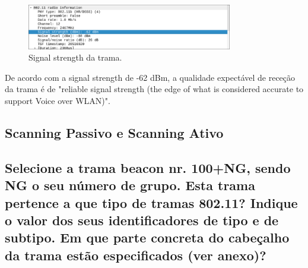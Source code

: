 \begin{figure}[h]
    \centering
    \includegraphics[width=0.8\textwidth]{signal.png}
    \caption{\label{fig:signal}Signal strength da trama.}
\end{figure}

De acordo com a signal strength de -62 dBm, a qualidade expectável de receção da trama é de "reliable signal strength (the edge of what is considered accurate to support Voice over WLAN)".

\subsection*{Scanning Passivo e Scanning Ativo}
\subsection{Selecione a trama beacon nr. 100+NG, sendo NG o seu número de grupo. Esta  trama pertence a que tipo de tramas 802.11? Indique o valor dos seus  identificadores de tipo e de subtipo. Em que parte concreta do cabeçalho da  trama estão especificados (ver anexo)?}

